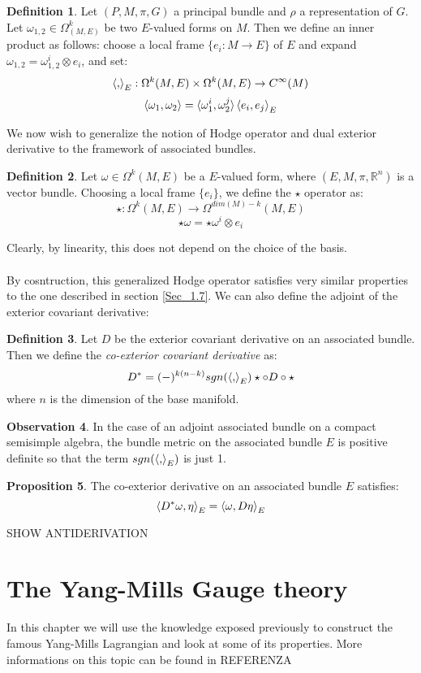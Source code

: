 \documentclass[12pt,a4paper]{report}
\theoremstyle{definition}
\newtheorem{Def}{Definition}[chapter]
\theoremstyle{Theorem}
\newtheorem{Prop}[Def]{Proposition}
\theoremstyle{definition}
\theoremstyle{definition}
\newtheorem{Obs}[Def]{Observation}
\begin{document}
	\begin{Def}
		Let $(P,M,\pi,G)$ a principal bundle and $\rho$ a representation of $G$. Let $\omega_{1,2}\in \Omega^k_(M,E)$ be two $E$-valued forms on $M$. Then we define an inner product as follows: choose a local frame $\{e_i:M\rightarrow E\}$ of $E$ and expand $\omega_{1,2}=\omega_{1,2}^i\otimes e_i$, and set:
		$$\braket{,}_{E}:\Omega^k(M,E)\times \Omega^k(M,E)\rightarrow C^\infty(M)$$
		$$\braket{\omega_1,\omega_2}=\braket{\omega_1^i,\omega_2^j}\braket{e_i,e_j}_E$$
	\end{Def}
	We now wish to generalize the notion of Hodge operator and dual exterior derivative to the framework of associated bundles.
	\begin{Def}
		Let $\omega\in\Omega^k(M,E)$ be a $E$-valued form, where $(E,M,\pi,\mathbb{R}^n)$ is a vector bundle. Choosing a local frame $\{e_i\}$, we define the $\star$ operator as:
		$$\star:\Omega^k(M,E)\rightarrow \Omega^{dim(M)-k}(M,E)$$
		$$\star\omega=\star\omega^i\otimes e_i$$ 
	\end{Def}
	Clearly, by linearity, this does not depend on the choice of the basis.\\
	\\
	By cosntruction, this generalized Hodge operator satisfies very similar properties to the one described in section \ref{Sec_1.7}. We can also define the adjoint of the exterior covariant derivative:
	\begin{Def}
		Let $D$ be the exterior covariant derivative on an associated bundle. Then we define the \textit{co-exterior covariant derivative} as:
		$$D^*=(-)^{k(n-k)}sgn(\braket{,}_E)\star\circ D\circ\star$$
		where $n$ is the dimension of the base manifold.
	\end{Def}
	\begin{Obs}
		In the case of an adjoint associated bundle on a compact semisimple algebra, the bundle metric on the associated bundle $E$ is positive definite so that the term $sgn(\braket{,}_E)$ is just 1.
	\end{Obs}
	\begin{Prop}
		The co-exterior derivative on an associated bundle $E$ satisfies:
		$$\braket{D^*\omega,\eta}_E=\braket{\omega,D\eta}_E$$
	\end{Prop}
	SHOW ANTIDERIVATION
	\chapter{The Yang-Mills Gauge theory}
	In this chapter we will use the knowledge exposed previously to construct the famous Yang-Mills Lagrangian and look at some of its properties. More informations on this topic can be found in REFERENZA
\end{document}
